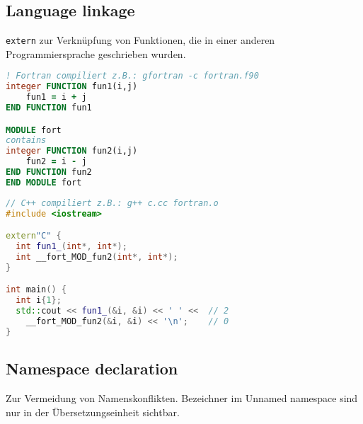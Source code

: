 \subsection{Language linkage}

\lstinline|extern| zur Verknüpfung von Funktionen, die in einer anderen
Programmiersprache geschrieben wurden.

\begin{lstlisting}[language=fortran]
! Fortran compiliert z.B.: gfortran -c fortran.f90
integer FUNCTION fun1(i,j)
    fun1 = i + j
END FUNCTION fun1

MODULE fort
contains
integer FUNCTION fun2(i,j)
    fun2 = i - j
END FUNCTION fun2
END MODULE fort
\end{lstlisting}

\begin{lstlisting}[language=C++]
// C++ compiliert z.B.: g++ c.cc fortran.o
#include <iostream>

extern"C" {
  int fun1_(int*, int*);
  int __fort_MOD_fun2(int*, int*);
}

int main() {
  int i{1};
  std::cout << fun1_(&i, &i) << ' ' <<  // 2
    __fort_MOD_fun2(&i, &i) << '\n';    // 0
}
\end{lstlisting}

\subsection{Namespace declaration}

Zur Vermeidung von Namenskonflikten.
Bezeichner im Unnamed namespace sind nur in der Übersetzungseinheit sichtbar.

